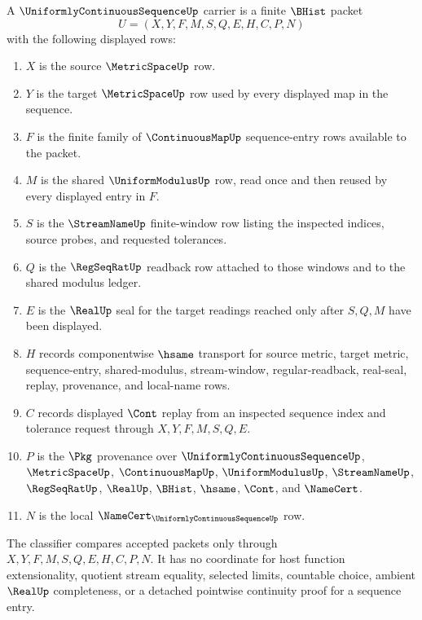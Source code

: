 \begin{definition}
\label{def:uniformly-continuous-sequence-carrier}
A $\UniformlyContinuousSequenceUp$ carrier is a finite $\BHist$ packet
$$
U=(X,Y,F,M,S,Q,E,H,C,P,N)
$$
with the following displayed rows:
\begin{enumerate}
\item $X$ is the source $\MetricSpaceUp$ row.
\item $Y$ is the target $\MetricSpaceUp$ row used by every displayed map in the sequence.
\item $F$ is the finite family of $\ContinuousMapUp$ sequence-entry rows available to the packet.
\item $M$ is the shared $\UniformModulusUp$ row, read once and then reused by every displayed entry in $F$.
\item $S$ is the $\StreamNameUp$ finite-window row listing the inspected indices, source probes, and requested tolerances.
\item $Q$ is the $\RegSeqRatUp$ readback row attached to those windows and to the shared modulus ledger.
\item $E$ is the $\RealUp$ seal for the target readings reached only after $S,Q,M$ have been displayed.
\item $H$ records componentwise $\hsame$ transport for source metric, target metric, sequence-entry, shared-modulus, stream-window, regular-readback, real-seal, replay, provenance, and local-name rows.
\item $C$ records displayed $\Cont$ replay from an inspected sequence index and tolerance request through $X,Y,F,M,S,Q,E$.
\item $P$ is the $\Pkg$ provenance over $\UniformlyContinuousSequenceUp$, $\MetricSpaceUp$, $\ContinuousMapUp$, $\UniformModulusUp$, $\StreamNameUp$, $\RegSeqRatUp$, $\RealUp$, $\BHist$, $\hsame$, $\Cont$, and $\NameCert$.
\item $N$ is the local $\NameCert_{\UniformlyContinuousSequenceUp}$ row.
\end{enumerate}
The classifier compares accepted packets only through $X,Y,F,M,S,Q,E,H,C,P,N$. It has no coordinate for host function extensionality, quotient stream equality, selected limits, countable choice, ambient $\RealUp$ completeness, or a detached pointwise continuity proof for a sequence entry.
\end{definition}

